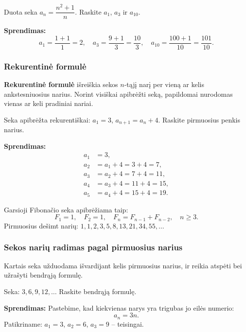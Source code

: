 \begin{example}
Duota seka $a_n = \dfrac{n^2 + 1}{n}$. Raskite $a_1$, $a_3$ ir $a_{10}$.

\textbf{Sprendimas:}
\[
a_1 = \frac{1+1}{1} = 2, \quad
a_3 = \frac{9+1}{3} = \frac{10}{3}, \quad
a_{10} = \frac{100+1}{10} = \frac{101}{10}.
\]
\end{example}

\subsubsection*{Rekurentinė formulė}

\begin{definition}
\textbf{Rekurentinė formulė} išreiškia sekos $n$-tąjį narį per vieną ar kelis ankstesniuosius narius. Norint visiškai apibrėžti seką, papildomai nurodomas vienas ar keli pradiniai nariai.
\end{definition}

\begin{example}
Seka apibrėžta rekurentiškai: $a_1 = 3$, $a_{n+1} = a_n + 4$. Raskite pirmuosius penkis narius.

\textbf{Sprendimas:}
\begin{align*}
a_1 &= 3, \\
a_2 &= a_1 + 4 = 3 + 4 = 7, \\
a_3 &= a_2 + 4 = 7 + 4 = 11, \\
a_4 &= a_3 + 4 = 11 + 4 = 15, \\
a_5 &= a_4 + 4 = 15 + 4 = 19.
\end{align*}
\end{example}

\begin{example}
Garsioji Fibonačio seka apibrėžiama taip:
\[
F_1 = 1, \quad F_2 = 1, \quad F_{n} = F_{n-1} + F_{n-2}, \quad n \geq 3.
\]
Pirmuosius dešimt narių: $1, 1, 2, 3, 5, 8, 13, 21, 34, 55, \ldots$
\end{example}

\subsubsection*{Sekos narių radimas pagal pirmuosius narius}

Kartais seka užduodama išvardijant kelis pirmuosius narius, ir reikia atspėti bei užrašyti bendrąją formulę.

\begin{example}
Seka: $3, 6, 9, 12, \ldots$ Raskite bendrąją formulę.

\textbf{Sprendimas:} Pastebime, kad kiekvienas narys yra trigubas jo eilės numerio:
\[
a_n = 3n.
\]
Patikriname: $a_1 = 3$, $a_2 = 6$, $a_3 = 9$ – teisingai.
\end{example}

